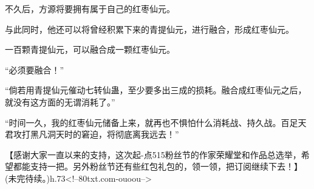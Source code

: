 \begin{this_body}
不久后，方源将要拥有属于自己的红枣仙元。

与此同时，他还可以将曾经积累下来的青提仙元，进行融合，形成红枣仙元。

一百颗青提仙元，可以融合成一颗红枣仙元。

“必须要融合！”

“倘若用青提仙元催动七转仙蛊，至少要多出三成的损耗。融合成红枣仙元之后，就没有这方面的无谓消耗了。”

“时间一久，我的红枣仙元储备上来，就再也不惧怕什么消耗战、持久战。百足天君攻打黑凡洞天时的窘迫，将彻底离我远去！”

【感谢大家一直以来的支持，这次起-点515粉丝节的作家荣耀堂和作品总选举，希望都能支持一把。另外粉丝节还有些红包礼包的，领一领，把订阅继续下去！】(未完待续。)h.73<!--80txt.com-ouoou-->

\end{this_body}

